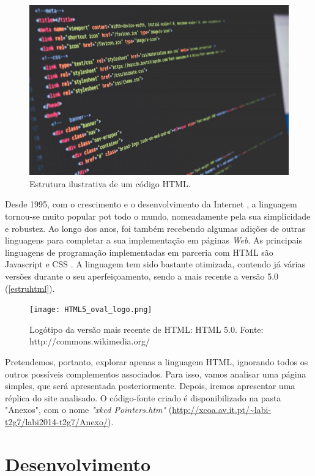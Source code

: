\documentclass[11pt,openright,twoside]{report}
\begin{document}
\begin{figure}
 \center
 \includegraphics[scale=0.35]{HTML.jpg}
 \caption{Estrutura ilustrativa de um código HTML.}
 \label{estruhtml}
\end{figure}

Desde 1995, com o crescimento e o desenvolvimento da Internet \cite{Internetus}, a linguagem tornou-se muito popular pot todo o mundo, nomeadamente pela sua simplicidade e robustez. Ao longo dos anos, foi também recebendo algumas adições de outras linguagens para completar a sua implementação em páginas \textit{Web}. As principais linguagens de programação implementadas em parceria com HTML são Javascript \cite{Javascript} e CSS \cite{Css}. A linguagem tem sido bastante otimizada, contendo já várias versões durante o seu aperfeiçoamento, sendo a mais recente a versão 5.0 \citep{w3c} (\autoref{estruhtml}).
\smallskip 

\begin{figure}
 \center
 \texttt{[image: HTML5\_oval\_logo.png]}
 \caption{Logótipo da versão mais recente de HTML: HTML 5.0. Fonte: http://commons.wikimedia.org/}
 \label{estruhtml}
\end{figure}

Pretendemos, portanto, explorar apenas a linguagem HTML, ignorando todos os outros possíveis complementos associados. Para isso, vamos analisar uma página simples, que será apresentada posteriormente. Depois, iremos apresentar uma réplica do site analisado. O código-fonte criado é disponibilizado na pasta "Anexos", com o nome \textit{"xkcd Pointers.htm"} (\url{http://xcoa.av.it.pt/~labi-t2g7/labi2014-t2g7/Anexo/}).

\part{Desenvolvimento}
\end{document}
